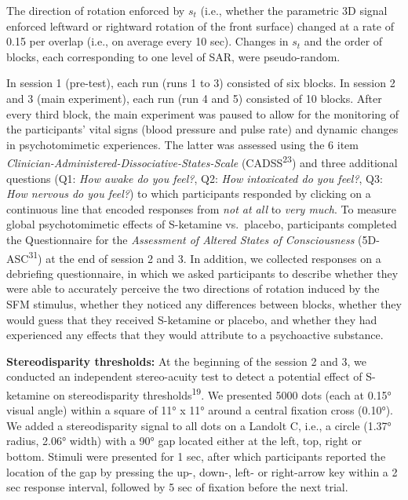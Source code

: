 \documentclass[
]{article}
\begin{document}
The direction of rotation enforced by \(s_t\) (i.e., whether the
parametric 3D signal enforced leftward or rightward rotation of the
front surface) changed at a rate of 0.15 per overlap (i.e., on average
every 10 sec). Changes in \(s_t\) and the order of blocks, each
corresponding to one level of SAR, were pseudo-random.

In session 1 (pre-test), each run (runs 1 to 3) consisted of six blocks.
In session 2 and 3 (main experiment), each run (run 4 and 5) consisted
of 10 blocks. After every third block, the main experiment was paused to
allow for the monitoring of the participants' vital signs (blood
pressure and pulse rate) and dynamic changes in psychotomimetic
experiences. The latter was assessed using the 6 item
\emph{Clinician-Administered-Dissociative-States-Scale}
(CADSS\textsuperscript{23}) and three additional questions (Q1:
\emph{How awake do you feel?}, Q2: \emph{How intoxicated do you feel?},
Q3: \emph{How nervous do you feel?}) to which participants responded by
clicking on a continuous line that encoded responses from \emph{not at
all} to \emph{very much}. To measure global psychotomimetic effects of
S-ketamine vs.~placebo, participants completed the Questionnaire for the
\emph{Assessment of Altered States of Consciousness}
(5D-ASC\textsuperscript{31}) at the end of session 2 and 3. In addition,
we collected responses on a debriefing questionnaire, in which we asked
participants to describe whether they were able to accurately perceive
the two directions of rotation induced by the SFM stimulus, whether they
noticed any differences between blocks, whether they would guess that
they received S-ketamine or placebo, and whether they had experienced
any effects that they would attribute to a psychoactive substance.

\textbf{Stereodisparity thresholds:} At the beginning of the session 2
and 3, we conducted an independent stereo-acuity test to detect a
potential effect of S-ketamine on stereodisparity
thresholds\textsuperscript{19}. We presented 5000 dots (each at 0.15°
visual angle) within a square of 11° x 11° around a central fixation
cross (0.10°). We added a stereodisparity signal to all dots on a
Landolt C, i.e., a circle (1.37° radius, 2.06° width) with a 90° gap
located either at the left, top, right or bottom. Stimuli were presented
for 1 sec, after which participants reported the location of the gap by
pressing the up-, down-, left- or right-arrow key within a 2 sec
response interval, followed by 5 sec of fixation before the next trial.
\end{document}
